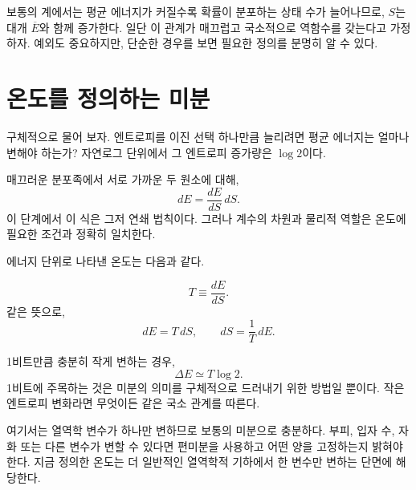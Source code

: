 보통의 계에서는 평균 에너지가 커질수록 확률이 분포하는 상태 수가 늘어나므로, \(S\)는 대개 \(\overline E\)와 함께 증가한다. 일단 이 관계가 매끄럽고 국소적으로 역함수를 갖는다고 가정하자. 예외도 중요하지만, 단순한 경우를 보면 필요한 정의를 분명히 알 수 있다.

\section{온도를 정의하는 미분}

구체적으로 물어 보자. 엔트로피를 이진 선택 하나만큼 늘리려면 평균 에너지는 얼마나 변해야 하는가? 자연로그 단위에서 그 엔트로피 증가량은 \(\log2\)이다.

매끄러운 분포족에서 서로 가까운 두 원소에 대해,
\begin{equation}
 dE=\frac{dE}{dS}\,dS.
 \label{eq:sm2-differential-identity}
\end{equation}
이 단계에서 이 식은 그저 연쇄 법칙이다. 그러나 계수의 차원과 물리적 역할은 온도에 필요한 조건과 정확히 일치한다.

에너지 단위로 나타낸 온도는 다음과 같다.
\begin{definition}
\begin{equation}
 T\equiv\frac{dE}{dS}.
 \label{eq:sm2-temperature-definition}
\end{equation}
같은 뜻으로,
\begin{equation}
 dE=T\,dS,
 \qquad
 dS=\frac{1}{T}\,dE.
 \label{eq:sm2-fundamental-differentials}
\end{equation}
\end{definition}

1비트만큼 충분히 작게 변하는 경우,
\begin{equation}
 \Delta E\simeq T\log2.
 \label{eq:sm2-one-bit-energy}
\end{equation}
1비트에 주목하는 것은 미분의 의미를 구체적으로 드러내기 위한 방법일 뿐이다. 작은 엔트로피 변화라면 무엇이든 같은 국소 관계를 따른다.

\begin{classroomqa}
\end{classroomqa}

여기서는 열역학 변수가 하나만 변하므로 보통의 미분으로 충분하다. 부피, 입자 수, 자화 또는 다른 변수가 변할 수 있다면 편미분을 사용하고 어떤 양을 고정하는지 밝혀야 한다. 지금 정의한 온도는 더 일반적인 열역학적 기하에서 한 변수만 변하는 단면에 해당한다.

